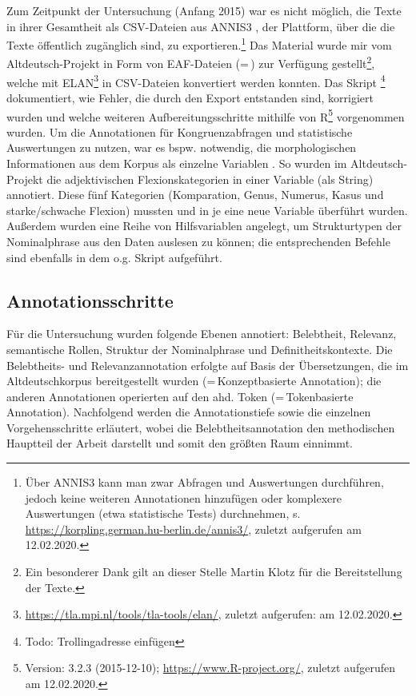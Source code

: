 Zum Zeitpunkt der Untersuchung (Anfang 2015) war es nicht möglich, die Texte in ihrer Gesamtheit als CSV-Dateien aus ANNIS3 \parencite{Krause2016}, der Plattform, über die die Texte öffentlich zugänglich sind, zu exportieren.\footnote{Über ANNIS3 kann man zwar Abfragen und Auswertungen durchführen, jedoch keine weiteren Annotationen hinzufügen oder komplexere Auswertungen (etwa statistische Tests) durchnehmen, s. \url{https://korpling.german.hu-berlin.de/annis3/}, zuletzt aufgerufen am 12.02.2020.} Das Material wurde mir vom Altdeutsch-Projekt in Form von EAF-Dateien (=\,) zur Verfügung gestellt\footnote{Ein besonderer Dank gilt an dieser Stelle Martin Klotz für die Bereitstellung der Texte.}, welche mit ELAN\footnote{\url{https://tla.mpi.nl/tools/tla-tools/elan/}, zuletzt aufgerufen: am 12.02.2020.} in CSV-Dateien konvertiert werden konnten. 
Das Skript \footnote{Todo: Trollingadresse einfügen} dokumentiert, wie Fehler, die durch den Export entstanden sind, korrigiert wurden und welche weiteren Aufbereitungsschritte mithilfe von R\footnote{Version: 3.2.3 (2015-12-10); \url{https://www.R-project.org/}, zuletzt aufgerufen am 12.02.2020.} vorgenommen wurden. 
Um die Annotationen für Kongruenzabfragen und statistische Auswertungen zu nutzen, war es bspw. notwendig, die morphologischen Informationen aus dem Korpus als einzelne Variablen . So wurden im Altdeutsch-Projekt die adjektivischen Flexionskategorien in einer Variable (als String)  annotiert. Diese fünf Kategorien (Komparation, Genus, Numerus, Kasus und starke/schwache Flexion) mussten  und in je eine neue Variable überführt wurden. Außerdem wurden eine Reihe von Hilfsvariablen angelegt, um Strukturtypen der Nominalphrase aus den Daten auslesen zu können; die entsprechenden Befehle sind ebenfalls in dem o.g. Skript aufgeführt.  

\subsection{Annotationsschritte}\label{sec:annotationsschritte}

Für die Untersuchung wurden folgende Ebenen annotiert: Belebtheit, Relevanz, semantische Rollen, Struktur der Nominalphrase und Definitheitskontexte. Die Belebtheits- und Relevanzannotation erfolgte auf Basis der Übersetzungen, die im Altdeutschkorpus bereitgestellt wurden (=\,Konzeptbasierte Annotation); die anderen Annotationen operierten auf den ahd. Token  (=\,Tokenbasierte Annotation). Nachfolgend werden die Annotationstiefe sowie die einzelnen Vorgehensschritte erläutert, wobei die Belebtheitsannotation den methodischen Hauptteil der Arbeit darstellt und somit den größten Raum einnimmt.

